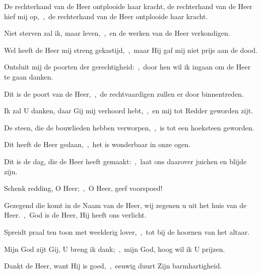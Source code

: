 \documentclass[12pt,twoside,a5paper]{article}
\begin{document}
\begin{halfparskip}
  De rechterhand van de Heer ontplooide haar kracht, de rechterhand van de Heer hief mij op,~\sep\ de rechterhand van de Heer ontplooide haar kracht.

  Niet sterven zal ik, maar leven,~\sep\ en de werken van de Heer verkondigen.

  Wel heeft de Heer mij streng gekastijd,~\sep\ maar Hij gaf mij niet prijs aan de dood.

  Ontsluit mij de poorten der gerechtigheid:~\sep\ door hen wil ik ingaan om de Heer te gaan danken.

  Dit is de poort van de Heer,~\sep\ de rechtvaardigen zullen er door binnentreden.

  Ik zal U danken, daar Gij mij verhoord hebt,~\sep\ en mij tot Redder geworden zijt.

  De steen, die de bouwlieden hebben verworpen,~\sep\ is tot een hoeksteen geworden.

  Dit heeft de Heer gedaan,~\sep\ het is wonderbaar in onze ogen.

  Dit is de dag, die de Heer heeft gemaakt:~\sep\ laat ons daarover juichen en blijde zijn.

  Schenk redding, O Heer;~\sep\ O Heer, geef voorspoed!

  Gezegend die komt in de Naam van de Heer, wij zegenen u uit het huis van de Heer.~\sep\ God is de Heer, Hij heeft ons verlicht.

  Spreidt praal ten toon met weelderig lover,~\sep\ tot bij de hoornen van het altaar.

  Mijn God zijt Gij, U breng ik dank;~\sep\ mijn God, hoog wil ik U prijzen.

  Dankt de Heer, want Hij is goed,~\sep\ eeuwig duurt Zijn barmhartigheid.
\end{halfparskip}



\end{document}
